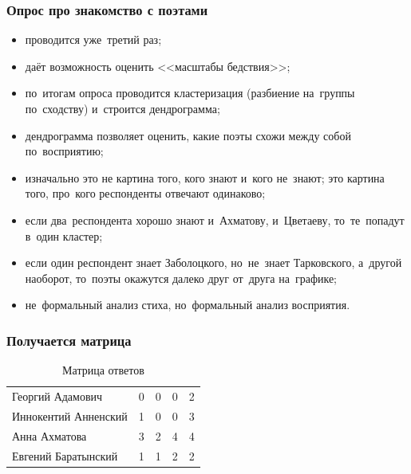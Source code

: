 \documentclass{beamer}
\begin{document}
\begin{frame}
\frametitle{Опрос про знакомство с поэтами}

\begin{itemize}
\item проводится уже~третий раз;
\item даёт возможность оценить <<масштабы бедствия>>;
\item по~итогам опроса проводится кластеризация (разбиение на~группы по~сходству) и~строится дендрограмма;
\item дендрограмма позволяет оценить, какие поэты схожи между собой по~восприятию;
\item изначально это не картина того, кого знают и~кого не~знают; это картина того, про~кого респонденты отвечают одинаково;
\item если два~респондента хорошо знают и~Ахматову, и~Цветаеву, то~те~попадут в~один кластер;
\item если один респондент знает Заболоцкого, но~не~знает Тарковского, а~другой наоборот, то~поэты окажутся далеко друг от~друга на~графике;
\item не~формальный анализ стиха, но~формальный анализ восприятия.
\end{itemize}

\end{frame}


\begin{frame}
\frametitle{Получается матрица}

\begin{table}[]
\centering
\caption{Матрица ответов}
\label{my-table}
\begin{tabular}{lllll}
Георгий Адамович     & 0 & 0 & 0 & 2 \\
Иннокентий Анненский & 1 & 0 & 0 & 3 \\
Анна Ахматова        & 3 & 2 & 4 & 4 \\
Евгений Баратынский  & 1 & 1 & 2 & 2
\end{tabular}
\end{table}


\end{frame}

\end{document}
